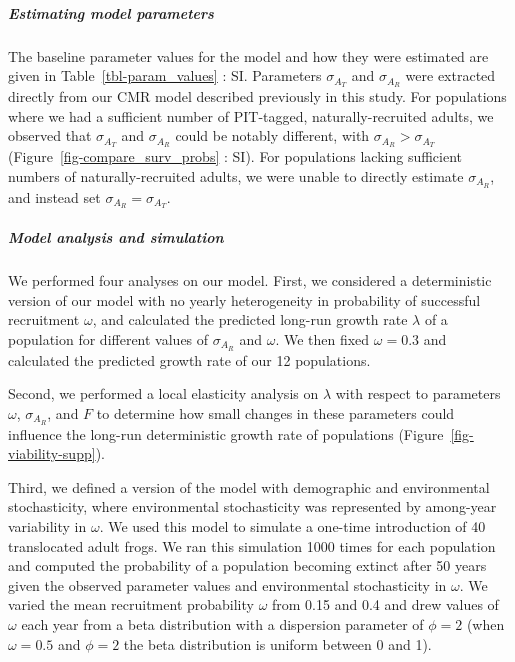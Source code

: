 \documentclass[9pt,twoside,lineno]{pnas-new}
\begin{document}
\hypertarget{estimating-model-parameters}{%
\subparagraph{Estimating model
parameters}\label{estimating-model-parameters}}

The baseline parameter values for the model and how they were estimated
are given in Table~\ref{tbl-param_values} : SI. Parameters
\(\sigma_{A_T}\) and \(\sigma_{A_R}\) were extracted directly from our
CMR model described previously in this study. For populations where we
had a sufficient number of PIT-tagged, naturally-recruited adults, we
observed that \(\sigma_{A_T}\) and \(\sigma_{A_R}\) could be notably
different, with \(\sigma_{A_R} > \sigma_{A_T}\)
(Figure~\ref{fig-compare_surv_probs} : SI). For populations lacking
sufficient numbers of naturally-recruited adults, we were unable to
directly estimate \(\sigma_{A_R}\), and instead set
\(\sigma_{A_R} = \sigma_{A_T}\).

\hypertarget{model-analysis-and-simulation}{%
\subparagraph{Model analysis and
simulation}\label{model-analysis-and-simulation}}

We performed four analyses on our model. First, we considered a
deterministic version of our model with no yearly heterogeneity in
probability of successful recruitment \(\omega\), and calculated the
predicted long-run growth rate \(\lambda\) of a population for different
values of \(\sigma_{A_R}\) and \(\omega\). We then fixed
\(\omega = 0.3\) and calculated the predicted growth rate of our 12
populations.

Second, we performed a local elasticity analysis on \(\lambda\) with
respect to parameters \(\omega\), \(\sigma_{A_R}\), and \(F\) to
determine how small changes in these parameters could influence the
long-run deterministic growth rate of populations
(Figure~\ref{fig-viability-supp}).

Third, we defined a version of the model with demographic and
environmental stochasticity, where environmental stochasticity was
represented by among-year variability in \(\omega\). We used this model
to simulate a one-time introduction of 40 translocated adult frogs. We
ran this simulation 1000 times for each population and computed the
probability of a population becoming extinct after 50 years given the
observed parameter values and environmental stochasticity in \(\omega\).
We varied the mean recruitment probability \(\omega\) from 0.15 and 0.4
and drew values of \(\omega\) each year from a beta distribution with a
dispersion parameter of \(\phi = 2\) (when \(\omega = 0.5\) and
\(\phi = 2\) the beta distribution is uniform between 0 and 1).
\end{document}
